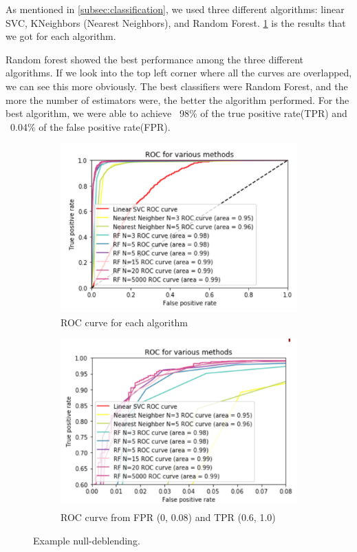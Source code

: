 \documentclass[\docopts]{\docclass}
\begin{document}
As mentioned in \ref{subsec:classification}, we used three different algorithms: linear SVC, KNeighbors (Nearest Neighbors), and Random Forest. \ref{fig:ML_nonmag} is the results that we got for each algorithm.

Random forest showed the best performance among the three different algorithms. If we look into the top left corner where all the curves are overlapped, we can see this more obviously. The best classifiers were Random Forest, and the more the number of estimators were, the better the algorithm performed. For the best algorithm, we were able to achieve ~98$\%$ of the true positive rate(TPR) and ~0.04$\%$ of the false positive rate(FPR).

\begin{figure}
    \centering
    \begin{subfigure}[bt]{0.48\linewidth}        %
        \centering
		\includegraphics[width=\linewidth]{ML_notmagnified.png}
	\caption{ROC curve for each algorithm}
	 \label{fig:ML_nonmag}
    \end{subfigure}
    \begin{subfigure}[bt]{0.48\linewidth}        %
        \centering
        \includegraphics[width=\linewidth]{ML_magnified.png}
		\caption{ROC curve from FPR (0, 0.08) and TPR (0.6, 1.0)}
		 \label{fig:ML Magnified}
    \end{subfigure}
    \caption{Example null-deblending.}
    \label{fig:null-deblend}
\end{figure}
\end{document}
